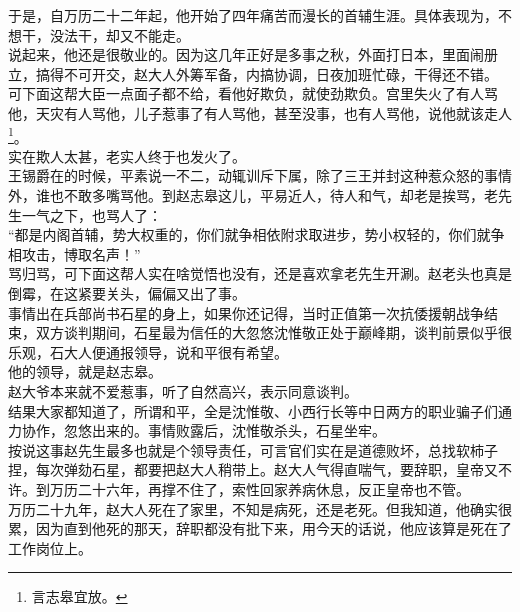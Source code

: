 \begin{multicols}{\theparacolNo}
于是，自万历二十二年起，他开始了四年痛苦而漫长的首辅生涯。具体表现为，不想干，没法干，却又不能走。\\

说起来，他还是很敬业的。因为这几年正好是多事之秋，外面打日本，里面闹册立，搞得不可开交，赵大人外筹军备，内搞协调，日夜加班忙碌，干得还不错。\\

可下面这帮大臣一点面子都不给，看他好欺负，就使劲欺负。宫里失火了有人骂他，天灾有人骂他，儿子惹事了有人骂他，甚至没事，也有人骂他，说他就该走人\footnote{言志皋宜放。}。\\

实在欺人太甚，老实人终于也发火了。\\

王锡爵在的时候，平素说一不二，动辄训斥下属，除了三王并封这种惹众怒的事情外，谁也不敢多嘴骂他。到赵志皋这儿，平易近人，待人和气，却老是挨骂，老先生一气之下，也骂人了：\\

“都是内阁首辅，势大权重的，你们就争相依附求取进步，势小权轻的，你们就争相攻击，博取名声！”\\

骂归骂，可下面这帮人实在啥觉悟也没有，还是喜欢拿老先生开涮。赵老头也真是倒霉，在这紧要关头，偏偏又出了事。\\

事情出在兵部尚书石星的身上，如果你还记得，当时正值第一次抗倭援朝战争结束，双方谈判期间，石星最为信任的大忽悠沈惟敬正处于巅峰期，谈判前景似乎很乐观，石大人便通报领导，说和平很有希望。\\

他的领导，就是赵志皋。\\

赵大爷本来就不爱惹事，听了自然高兴，表示同意谈判。\\

结果大家都知道了，所谓和平，全是沈惟敬、小西行长等中日两方的职业骗子们通力协作，忽悠出来的。事情败露后，沈惟敬杀头，石星坐牢。\\

按说这事赵先生最多也就是个领导责任，可言官们实在是道德败坏，总找软柿子捏，每次弹劾石星，都要把赵大人稍带上。赵大人气得直喘气，要辞职，皇帝又不许。到万历二十六年，再撑不住了，索性回家养病休息，反正皇帝也不管。\\

万历二十九年，赵大人死在了家里，不知是病死，还是老死。但我知道，他确实很累，因为直到他死的那天，辞职都没有批下来，用今天的话说，他应该算是死在了工作岗位上。\\


\end{multicols}
